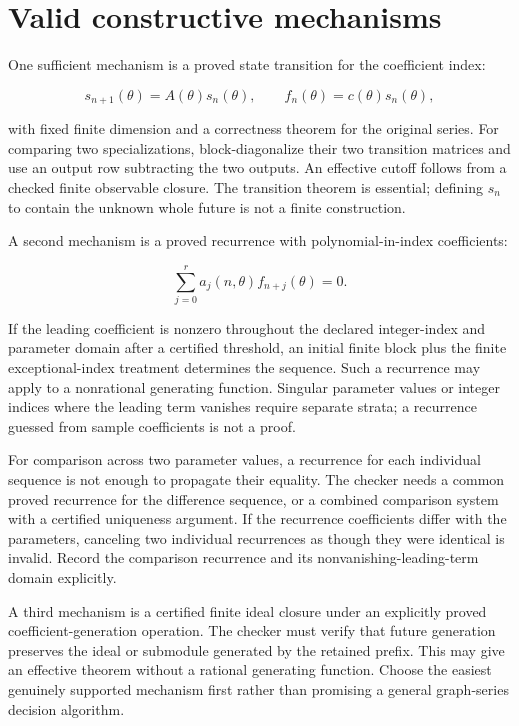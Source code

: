 \documentclass[
  11pt,
  a4paper,
]{report}
\begin{document}
\hypertarget{valid-constructive-mechanisms}{%
\section{Valid constructive
mechanisms}\label{valid-constructive-mechanisms}}

One sufficient mechanism is a proved state transition for the
coefficient index:

\[
s_{n+1}(\theta)=A(\theta)s_n(\theta),\qquad
f_n(\theta)=c(\theta)s_n(\theta),
\]

with fixed finite dimension and a correctness theorem for the original
series. For comparing two specializations, block-diagonalize their two
transition matrices and use an output row subtracting the two outputs.
An effective cutoff follows from a checked finite observable closure.
The transition theorem is essential; defining \(s_n\) to contain the
unknown whole future is not a finite construction.

A second mechanism is a proved recurrence with polynomial-in-index
coefficients:

\[
\sum_{j=0}^{r}a_j(n,\theta)f_{n+j}(\theta)=0.
\]

If the leading coefficient is nonzero throughout the declared
integer-index and parameter domain after a certified threshold, an
initial finite block plus the finite exceptional-index treatment
determines the sequence. Such a recurrence may apply to a nonrational
generating function. Singular parameter values or integer indices where
the leading term vanishes require separate strata; a recurrence guessed
from sample coefficients is not a proof.

For comparison across two parameter values, a recurrence for each
individual sequence is not enough to propagate their equality. The
checker needs a common proved recurrence for the difference sequence, or
a combined comparison system with a certified uniqueness argument. If
the recurrence coefficients differ with the parameters, canceling two
individual recurrences as though they were identical is invalid. Record
the comparison recurrence and its nonvanishing-leading-term domain
explicitly.

A third mechanism is a certified finite ideal closure under an
explicitly proved coefficient-generation operation. The checker must
verify that future generation preserves the ideal or submodule generated
by the retained prefix. This may give an effective theorem without a
rational generating function. Choose the easiest genuinely supported
mechanism first rather than promising a general graph-series decision
algorithm.
\end{document}

